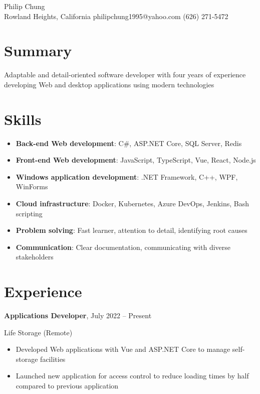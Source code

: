 \documentclass[11pt]{article}
\newcommand{\titleheader}[2]{\textbf{#1}, #2}
\newcommand{\locheader}[2]{#1 (#2)}
\begin{document}
	\begin{center}
		{\LARGE Philip Chung} \\ \vspace{0.5em}
		Rowland Heights, California  philipchung1995@yahoo.com  (626) 271-5472
	\end{center}

	\section*{Summary}

	Adaptable and detail-oriented software developer with four years of experience developing Web and desktop applications using modern technologies

	\section*{Skills}

	\newcommand{\skillitem}[2]{\item \textbf{#1}: #2}

	\begin{itemize}
		\skillitem{Back-end Web development}{C\#, ASP.NET Core, SQL Server, Redis}
		\skillitem{Front-end Web development}{JavaScript, TypeScript, Vue, React, Node.js}
		\skillitem{Windows application development}{.NET Framework, C++, WPF, WinForms}
		\skillitem{Cloud infrastructure}{Docker, Kubernetes, Azure DevOps, Jenkins, Bash scripting}
		\skillitem{Problem solving}{Fast learner, attention to detail, identifying root causes}
		\skillitem{Communication}{Clear documentation, communicating with diverse stakeholders}
	\end{itemize}

	\section*{Experience}

	\titleheader{Applications Developer}{July 2022 -- Present}

	\locheader{Life Storage}{Remote}

	\begin{itemize}
		\item Developed Web applications with Vue and ASP.NET Core to manage self-storage facilities
		\item Launched new application for access control to reduce loading times by half compared to previous application
	\end{itemize}
\end{document}
